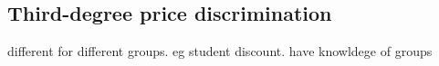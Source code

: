 
\subsection{Third-degree price discrimination}

different for different groups. eg student discount. have knowldege of groups


